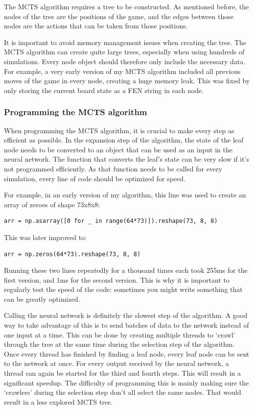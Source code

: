 \documentclass{article}
\begin{document}
The MCTS algorithm requires a tree to be constructed. As mentioned before, the nodes of the tree
are the positions of the game, and the edges between those nodes are the actions that can be taken
from those positions. 

It is important to avoid memory management issues when creating the tree. The MCTS algorithm 
can create quite large trees, especially when using hundreds of simulations. Every node object
should therefore only include the necessary data. For example, a very early version of my MCTS algorithm 
included all previous moves of the game in every node, creating a huge memory leak. This was fixed
by only storing the current board state as a FEN string in each node.

\subsubsection{Programming the MCTS algorithm}

When programming the MCTS algorithm, it is crucial to make every step as efficient as possible.
In the expansion step of the algorithm, the state of the leaf node needs to be converted to an object
that can be used as an input in the neural network. The function that converts the leaf's state 
can be very slow if it's not programmed efficiently. As that function needs to be called for every
simulation, every line of code should be optimized for speed.

For example, in an early version of my algorithm, this line was used to create an array of zeroes of 
shape 73x8x8:

\begin{verbatim}
arr = np.asarray([0 for _ in range(64*73)]).reshape(73, 8, 8)
\end{verbatim}

This was later improved to:

\begin{verbatim}
arr = np.zeros(64*73).reshape(73, 8, 8)
\end{verbatim}

Running these two lines repeatedly for a thousand times each took 255ms for the first version, and 1ms for the second version.
This is why it is important to regularly test the speed of the code: sometimes you might write something
that can be greatly optimized. 


Calling the neural network is definitely the slowest step of the algorithm. A good way to take 
advantage of this is to send batches of data to the network instead of one input at a time. 
This can be done by creating multiple threads to `crawl' through the tree at the same time 
during the selection step of the algorithm. 
Once every thread has finished by finding a leaf node, every leaf node can be sent to the network at once. 
For every output received by the neural network, a thread can again be started for the third and fourth steps. 
This will result in a significant speedup. 
The difficulty of programming this is mainly making sure the `crawlers' during the selection step
don't all select the same nodes. That would result in a less explored MCTS tree.
\end{document}
